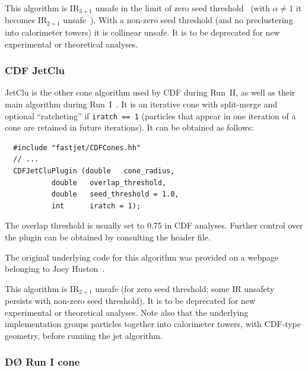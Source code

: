 \documentclass[12pt,a4]{article}
\newcommand{\ttt}[1]{{\small\texttt{#1}}}
\newcommand{\Dzero}{D\O\xspace}
\begin{document}
This algorithm is IR$_{3+1}$ unsafe in the limit of zero seed
threshold~\cite{SISCone} (with $\alpha \neq 1$ it
becomes IR$_{2+1}$ unsafe~\cite{TeV4LHC}).
%
With a non-zero seed threshold (and no preclustering into calorimeter
towers) it is collinear unsafe.
%
It is to be
deprecated for new experimental or theoretical analyses.

\subsubsection{CDF JetClu}

JetClu is the other cone algorithm used by CDF during Run~II, as well
as their main algorithm during Run~I~\cite{Abe:1991ui}. 
%
It is an iterative cone with split-merge and optional ``ratcheting''
if \ttt{iratch == 1} (particles that appear in one iteration of a cone
are retained in future iterations).
%
It can be obtained as follows:
\begin{lstlisting}
  #include "fastjet/CDFCones.hh"
  // ...
  CDFJetCluPlugin (double   cone_radius, 
		   double   overlap_threshold, 
		   double   seed_threshold = 1.0,
		   int      iratch = 1);
\end{lstlisting}
%
The overlap threshold is usually set to 0.75 in CDF analyses.
%
Further control over the plugin can be obtained by consulting the
header file.

The original underlying code for this algorithm was provided on a
webpage belonging to Joey Huston~\cite{CDFCones}.

This algorithm is IR$_{2+1}$ unsafe (for zero seed threshold; some
IR unsafety persists with non-zero seed threshold). 
It is to be
deprecated for new experimental or theoretical analyses.
%
Note also that the underlying implementation groups particles together
into calorimeter towers, with CDF-type geometry, before running the
jet algorithm. 

\subsubsection{\Dzero Run I cone}
\end{document}
